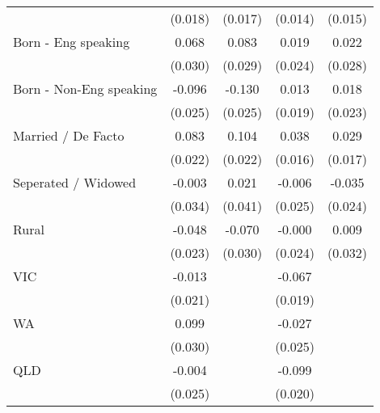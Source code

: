 {\begin{tabular}{l*{4}{c}}
                    &     (0.018)         &     (0.017)         &     (0.014)         &     (0.015)         \\
[1em]
Born - Eng speaking &       0.068\sym{*}  &       0.083\sym{**} &       0.019         &       0.022         \\
                    &     (0.030)         &     (0.029)         &     (0.024)         &     (0.028)         \\
[1em]
Born - Non-Eng speaking&      -0.096\sym{***}&      -0.130\sym{***}&       0.013         &       0.018         \\
                    &     (0.025)         &     (0.025)         &     (0.019)         &     (0.023)         \\
[1em]
Married / De Facto  &       0.083\sym{***}&       0.104\sym{***}&       0.038\sym{*}  &       0.029         \\
                    &     (0.022)         &     (0.022)         &     (0.016)         &     (0.017)         \\
[1em]
Seperated / Widowed &      -0.003         &       0.021         &      -0.006         &      -0.035         \\
                    &     (0.034)         &     (0.041)         &     (0.025)         &     (0.024)         \\
[1em]
Rural               &      -0.048\sym{*}  &      -0.070\sym{*}  &      -0.000         &       0.009         \\
                    &     (0.023)         &     (0.030)         &     (0.024)         &     (0.032)         \\
[1em]
VIC                 &      -0.013         &                     &      -0.067\sym{***}&                     \\
                    &     (0.021)         &                     &     (0.019)         &                     \\
[1em]
WA                  &       0.099\sym{***}&                     &      -0.027         &                     \\
                    &     (0.030)         &                     &     (0.025)         &                     \\
[1em]
QLD                 &      -0.004         &                     &      -0.099\sym{***}&                     \\
                    &     (0.025)         &                     &     (0.020)         &                     \\

\end{tabular}}
